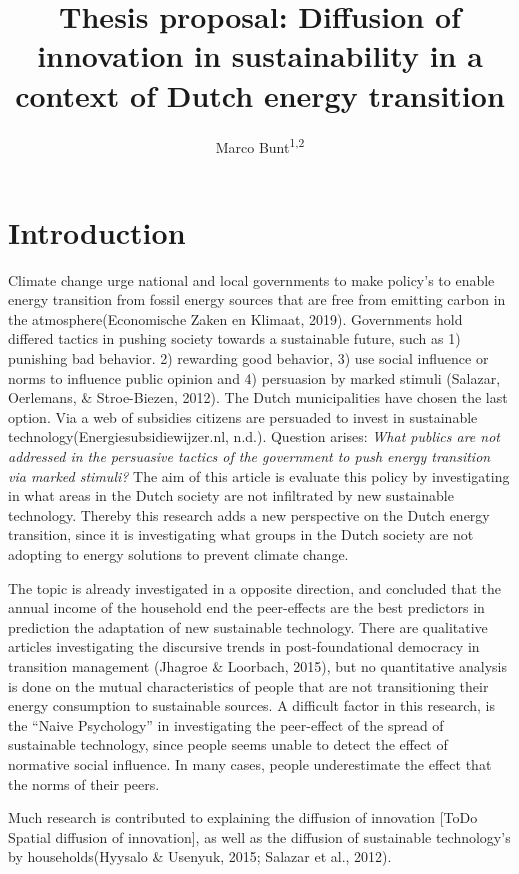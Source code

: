 \documentclass[english,man,doc,11pt, twoside,floatsintext]{apa6}
\title{Thesis proposal: Diffusion of innovation in sustainability in a context
of Dutch energy transition}
\author{Marco Bunt\textsuperscript{1,2}}
\date{}
\affiliation{
\vspace{0.5cm}
\textsuperscript{1} Erasmus school of social and behavioural sciences\\\textsuperscript{2} Stedin netbeheer}
\begin{document}
\maketitle

\section{Introduction}\label{introduction}

Climate change urge national and local governments to make policy's to
enable energy transition from fossil energy sources that are free from
emitting carbon in the atmosphere(Economische Zaken en Klimaat, 2019).
Governments hold differed tactics in pushing society towards a
sustainable future, such as 1) punishing bad behavior. 2) rewarding good
behavior, 3) use social influence or norms to influence public opinion
and 4) persuasion by marked stimuli (Salazar, Oerlemans, \&
Stroe-Biezen, 2012). The Dutch municipalities have chosen the last
option. Via a web of subsidies citizens are persuaded to invest in
sustainable technology(Energiesubsidiewijzer.nl, n.d.). Question arises:
\emph{What publics are not addressed in the persuasive tactics of the
government to push energy transition via marked stimuli?} The aim of
this article is evaluate this policy by investigating in what areas in
the Dutch society are not infiltrated by new sustainable technology.
Thereby this research adds a new perspective on the Dutch energy
transition, since it is investigating what groups in the Dutch society
are not adopting to energy solutions to prevent climate change.

The topic is already investigated in a opposite direction, and concluded
that the annual income of the household end the peer-effects are the
best predictors in prediction the adaptation of new sustainable
technology. There are qualitative articles investigating the discursive
trends in post-foundational democracy in transition management (Jhagroe
\& Loorbach, 2015), but no quantitative analysis is done on the mutual
characteristics of people that are not transitioning their energy
consumption to sustainable sources. A difficult factor in this research,
is the \enquote{Naive Psychology} in investigating the peer-effect of
the spread of sustainable technology, since people seems unable to
detect the effect of normative social influence. In many cases, people
underestimate the effect that the norms of their peers.

Much research is contributed to explaining the diffusion of innovation
{[}ToDo Spatial diffusion of innovation{]}, as well as the diffusion of
sustainable technology's by households(Hyysalo \& Usenyuk, 2015; Salazar
et al., 2012).
\end{document}
